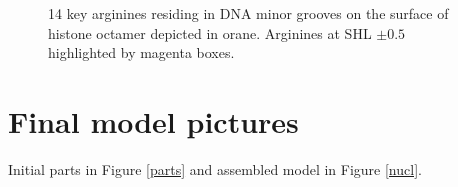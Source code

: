\documentclass[12pt,onecolumn]{scrartcl}
\begin{document}
\begin{figure}[h]
\begin{center}
\caption{14 key arginines residing in DNA minor grooves on the surface of histone octamer depicted in orane. Arginines at SHL $\pm0.5$ highlighted by magenta boxes.}
\label{14arginines}
\end{center}
\end{figure}

\section{Final model pictures}
Initial parts in Figure \ref{parts} and assembled model in Figure \ref{nucl}.
\end{document}

